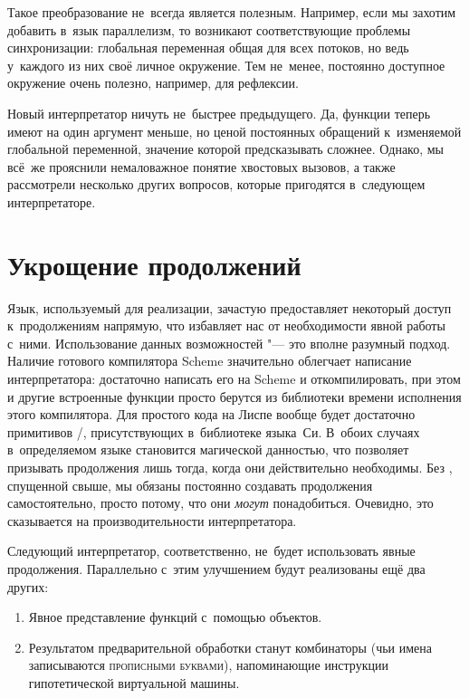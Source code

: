 Такое преобразование не~всегда является полезным. Например, если мы захотим
добавить в~язык параллелизм, то возникают соответствующие проблемы
синхронизации: глобальная переменная  общая для всех потоков, но ведь
у~каждого из них своё личное окружение. Тем не~менее, постоянно доступное
окружение очень полезно, например, для рефлексии.

Новый интерпретатор ничуть не~быстрее предыдущего. Да, функции теперь имеют на
один аргумент меньше, но ценой постоянных обращений к~изменяемой глобальной
переменной, значение которой предсказывать сложнее. Однако, мы всё~же прояснили
немаловажное понятие хвостовых вызовов, а также рассмотрели несколько других
вопросов, которые пригодятся в~следующем интерпретаторе.


\section{Укрощение продолжений}\label{fast/sect:dilute}

Язык, используемый для реализации, зачастую предоставляет некоторый доступ
к~продолжениям напрямую, что избавляет нас от необходимости явной работы с~ними.
Использование данных возможностей "--- это вполне разумный подход. Наличие
готового компилятора Scheme значительно облегчает написание интерпретатора:
достаточно написать его на Scheme и откомпилировать, при этом  и
другие встроенные функции просто берутся из библиотеки времени исполнения
этого компилятора. Для простого кода на Лиспе вообще будет достаточно примитивов
\slash{}, присутствующих в~библиотеке языка~Си. В~обоих
случаях в~определяемом языке  становится магической данностью, что
позволяет призывать продолжения лишь тогда, когда они действительно необходимы.
Без , спущенной свыше, мы обязаны постоянно создавать продолжения
самостоятельно, просто потому, что они \emph{могут} понадобиться. Очевидно, это
сказывается на производительности интерпретатора.

Следующий интерпретатор, соответственно, не~будет использовать явные
продолжения. Параллельно с~этим улучшением будут реализованы ещё два других:

\begin{enumerate}
  \item Явное представление функций с~помощью объектов.

  \item Результатом предварительной обработки станут комбинаторы
        (чьи имена записываются \textsc{прописными буквами}),
        напоминающие инструкции гипотетической виртуальной машины.
\end{enumerate}

